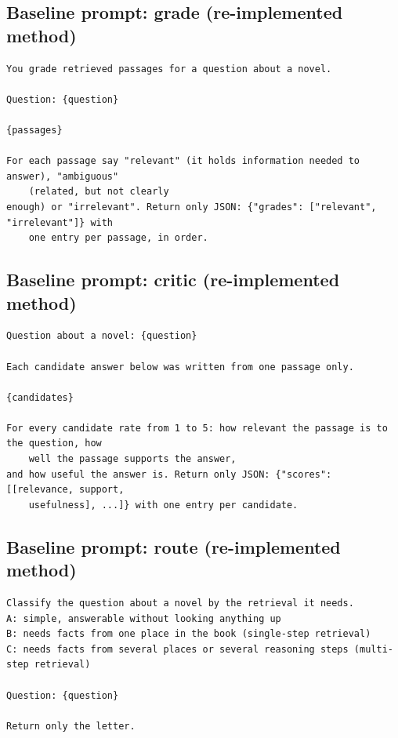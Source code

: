 \subsection{Baseline prompt: grade (re-implemented method)}
\begin{footnotesize}
\begin{verbatim}
You grade retrieved passages for a question about a novel.

Question: {question}

{passages}

For each passage say "relevant" (it holds information needed to answer), "ambiguous"
    (related, but not clearly
enough) or "irrelevant". Return only JSON: {"grades": ["relevant", "irrelevant"]} with
    one entry per passage, in order.
\end{verbatim}
\end{footnotesize}

\subsection{Baseline prompt: critic (re-implemented method)}
\begin{footnotesize}
\begin{verbatim}
Question about a novel: {question}

Each candidate answer below was written from one passage only.

{candidates}

For every candidate rate from 1 to 5: how relevant the passage is to the question, how
    well the passage supports the answer,
and how useful the answer is. Return only JSON: {"scores": [[relevance, support,
    usefulness], ...]} with one entry per candidate.
\end{verbatim}
\end{footnotesize}

\subsection{Baseline prompt: route (re-implemented method)}
\begin{footnotesize}
\begin{verbatim}
Classify the question about a novel by the retrieval it needs.
A: simple, answerable without looking anything up
B: needs facts from one place in the book (single-step retrieval)
C: needs facts from several places or several reasoning steps (multi-step retrieval)

Question: {question}

Return only the letter.
\end{verbatim}
\end{footnotesize}

